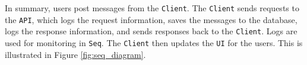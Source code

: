 In summary, users post messages from the \texttt{Client}.
The \texttt{Client} sends requests to the \texttt{API}, which logs the request 
information, saves the messages to the database, 
logs the response information, and sends responses back to the 
\texttt{Client}. Logs are used for monitoring in \texttt{Seq}. 
The \texttt{Client} then updates the \texttt{UI} for the users.
This is illustrated in Figure \ref{fig:seq_diagram}.
